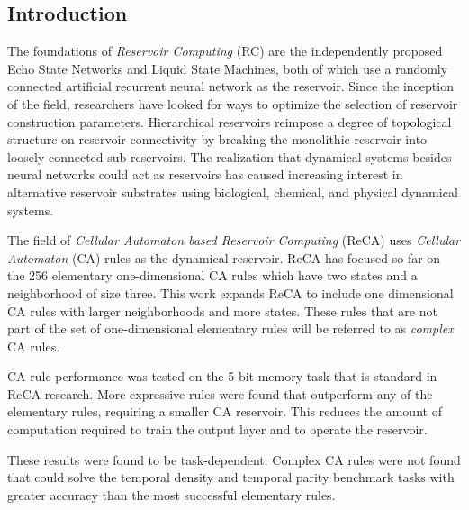 \documentclass{elsarticle}
\begin{document}
\begin{multicols}{2}
	
	\section{Introduction}\label{introduction}
	The foundations of \textit{Reservoir Computing} (RC) are the 
	independently proposed Echo State Networks and Liquid State Machines, both of 
	which use a randomly connected artificial recurrent neural network as the 
	reservoir.  Since the inception of the field,  researchers have looked for ways 
	to optimize the selection of reservoir construction parameters. Hierarchical 
	reservoirs reimpose a degree of topological structure on reservoir connectivity 
	by breaking the monolithic reservoir into loosely connected sub-reservoirs. The 
	realization that dynamical systems besides neural networks could act as 
	reservoirs has caused increasing interest in alternative reservoir substrates 
	using biological, chemical, and physical dynamical systems.  \par
	The field of \textit{Cellular Automaton based Reservoir Computing} (ReCA) uses 
	\textit{Cellular Automaton} (CA) rules as the dynamical reservoir. ReCA has 
	focused so far on the 256 elementary one-dimensional CA rules which have two 
	states and a neighborhood of size three.  This work expands ReCA to include one 
	dimensional CA rules with larger neighborhoods and more states.
	These rules that are not part of the set of one-dimensional elementary 
	rules will be referred to as \textit{complex} CA rules. \par CA rule 
	performance was tested on the 5-bit memory task that is standard in ReCA 
	research. More expressive rules were found that outperform any of the 
	elementary rules, requiring a smaller CA reservoir. This reduces the amount 
	of computation required to train the output layer and to operate the 
	reservoir. \par These results were found to be task-dependent. Complex CA 
	rules were not found that could solve the temporal density and temporal 
	parity benchmark tasks with greater accuracy than the most successful 
	elementary rules. \par

\end{multicols}
\end{document}

